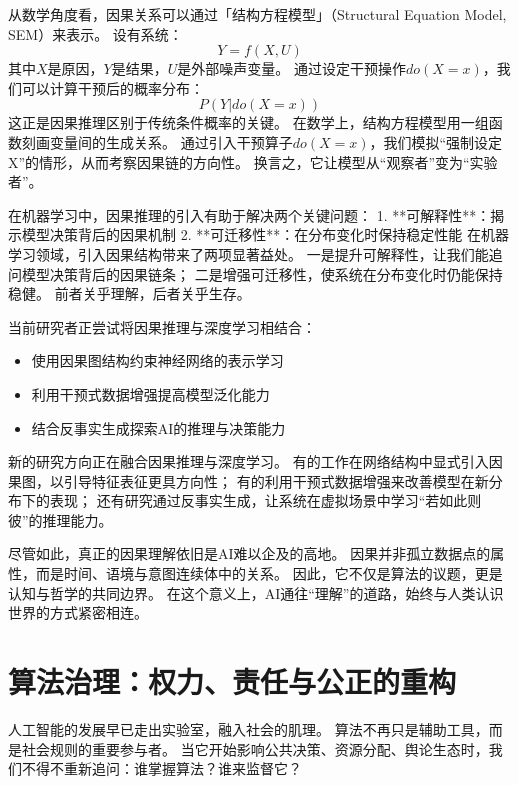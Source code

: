 从数学角度看，因果关系可以通过「结构方程模型」（Structural Equation Model, SEM）来表示。
设有系统：
\begin{equation}
Y = f(X, U)
\end{equation}
其中$X$是原因，$Y$是结果，$U$是外部噪声变量。
通过设定干预操作$do(X=x)$，我们可以计算干预后的概率分布：
\begin{equation}
P(Y|do(X=x))
\end{equation}
这正是因果推理区别于传统条件概率的关键。
在数学上，结构方程模型用一组函数刻画变量间的生成关系。
通过引入干预算子$do(X=x)$，我们模拟“强制设定X”的情形，从而考察因果链的方向性。
换言之，它让模型从“观察者”变为“实验者”。

在机器学习中，因果推理的引入有助于解决两个关键问题：
1. **可解释性**：揭示模型决策背后的因果机制
2. **可迁移性**：在分布变化时保持稳定性能
在机器学习领域，引入因果结构带来了两项显著益处。
一是提升可解释性，让我们能追问模型决策背后的因果链条；
二是增强可迁移性，使系统在分布变化时仍能保持稳健。
前者关乎理解，后者关乎生存。

当前研究者正尝试将因果推理与深度学习相结合：
\begin{itemize}
\item 使用因果图结构约束神经网络的表示学习
\item 利用干预式数据增强提高模型泛化能力
\item 结合反事实生成探索AI的推理与决策能力
\end{itemize}
新的研究方向正在融合因果推理与深度学习。
有的工作在网络结构中显式引入因果图，以引导特征表征更具方向性；
有的利用干预式数据增强来改善模型在新分布下的表现；
还有研究通过反事实生成，让系统在虚拟场景中学习“若如此则彼”的推理能力。

尽管如此，真正的因果理解依旧是AI难以企及的高地。
因果并非孤立数据点的属性，而是时间、语境与意图连续体中的关系。
因此，它不仅是算法的议题，更是认知与哲学的共同边界。
在这个意义上，AI通往“理解”的道路，始终与人类认识世界的方式紧密相连。

\section{算法治理：权力、责任与公正的重构}

人工智能的发展早已走出实验室，融入社会的肌理。  
算法不再只是辅助工具，而是社会规则的重要参与者。  
当它开始影响公共决策、资源分配、舆论生态时，我们不得不重新追问：谁掌握算法？谁来监督它？

